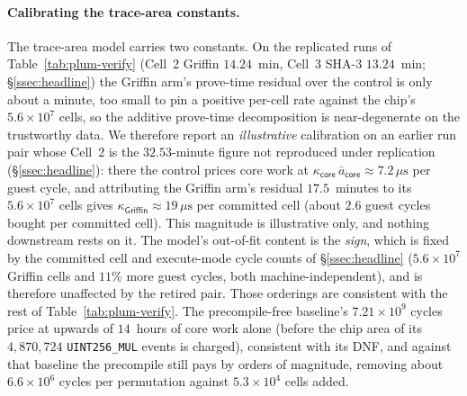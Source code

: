 \paragraph{Calibrating the trace-area constants.}
The trace-area model carries two constants. On the replicated runs of Table~\ref{tab:plum-verify} (Cell~2 Griffin $14.24$~min, Cell~3 SHA-3 $13.24$~min; \S\ref{ssec:headline}) the Griffin arm's prove-time residual over the control is only about a minute, too small to pin a positive per-cell rate against the chip's $5.6\times10^{7}$ cells, so the additive prove-time decomposition is near-degenerate on the trustworthy data. We therefore report an \emph{illustrative} calibration on an earlier run pair whose Cell~2 is the $32.53$-minute figure not reproduced under replication (\S\ref{ssec:headline}): there the control prices core work at $\kappa_{\mathsf{core}}\,\bar a_{\mathsf{core}}\approx 7.2\,\mu\mathrm{s}$ per guest cycle, and attributing the Griffin arm's residual $17.5$~minutes to its $5.6\times10^{7}$ cells gives $\kappa_{\mathsf{Griffin}}\approx 19\,\mu\mathrm{s}$ per committed cell (about $2.6$ guest cycles bought per committed cell). This magnitude is illustrative only, and nothing downstream rests on it. The model's out-of-fit content is the \emph{sign}, which is fixed by the committed cell and execute-mode cycle counts of \S\ref{ssec:headline} ($5.6\times10^{7}$ Griffin cells and $11\%$ more guest cycles, both machine-independent), and is therefore unaffected by the retired pair. Those orderings are consistent with the rest of Table~\ref{tab:plum-verify}. The precompile-free baseline's $7.21\times10^{9}$ cycles price at upwards of $14$~hours of core work alone (before the chip area of its $4{,}870{,}724$ \texttt{UINT256\_MUL} events is charged), consistent with its DNF, and against that baseline the precompile still pays by orders of magnitude, removing about $6.6\times10^{6}$ cycles per permutation against $5.3\times10^{4}$ cells added.

